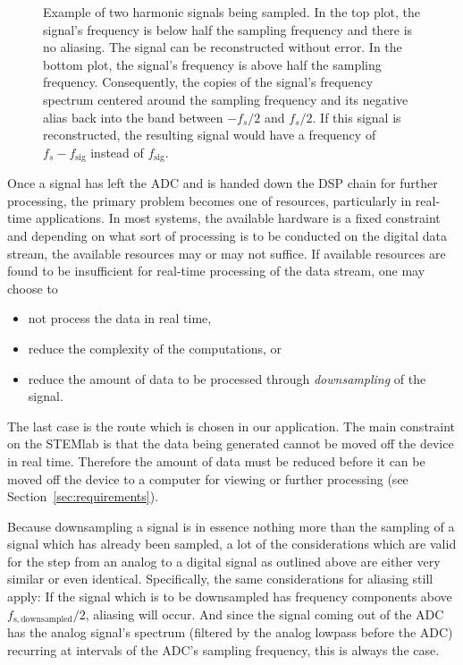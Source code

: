 \begin{figure}
    \centering
    
    \caption[Aliasing With Harmonic Signals]{%
        Example of  two harmonic signals  being sampled. In the top  plot, the
        signal's frequency is  below half the sampling frequency  and there is
        no aliasing. The  signal can be  reconstructed without error.   In the
        bottom  plot,  the  signal's  frequency is  above  half  the  sampling
        frequency. Consequently, the copies of the signal's frequency spectrum
        centered around  the sampling  frequency and  its negative  alias back
        into  the  band  between  $-f_s/2$  and  $f_s/2$. If  this  signal  is
        reconstructed, the resulting  signal would have a frequency  of $f_s -
        f_{\mathrm{sig}}$ instead of $f_{\mathrm{sig}}$.%
    }
    \label{fig:aliasing:dirac}
\end{figure}


Once a signal  has left the ADC and  is handed down the DSP  chain for further
processing,  the primary  problem becomes  one of  resources, particularly  in
real-time applications. In  most systems,  the available  hardware is  a fixed
constraint and depending on what sort of  processing is to be conducted on the
digital  data stream,  the available  resources may  or may  not suffice.   If
available resources are  found to be insufficient for  real-time processing of
the data stream, one may choose to
\begin{itemize}\tightlist
    \item
        not process the data in real time,
    \item
        reduce the complexity of the computations, or
    \item
        reduce the amount of data to be processed through \emph{downsampling}
        of the signal.
\end{itemize}
The  last case  is the  route  which is  chosen in  our application. The  main
constraint on the STEMlab is that the data being generated cannot be moved off
the device in real time.  Therefore the  amount of data must be reduced before
it can be moved off the device to a computer for viewing or further processing
(see Section~\ref{sec:requirements}).

Because downsampling a signal is in  essence nothing more than the sampling of
a  signal  which  has  already  been sampled,  a  lot  of  the  considerations
which  are  valid  for  the  step  from an  analog  to  a  digital  signal  as
outlined above  are either very  similar or even  identical. Specifically, the
same  considerations for  aliasing  still  apply: If the  signal  which is  to
be  downsampled has  frequency components  above $f_\mathrm{s,downsampled}/2$,
aliasing will occur. And since the signal coming out of the ADC has the analog
signal's spectrum (filtered by the analog lowpass before the ADC) recurring at
intervals of the ADC's sampling frequency, this is always the case.

